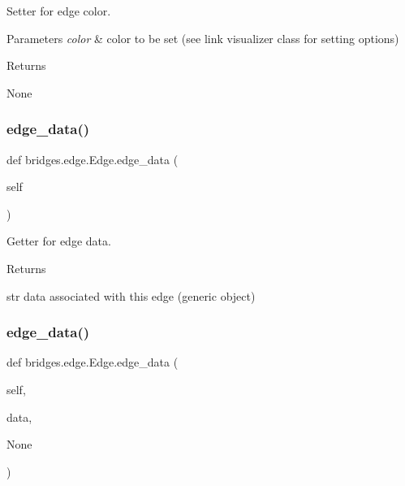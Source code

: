 Setter for edge color. 


\begin{DoxyParams}{Parameters}
{\em color} & color to be set (see link visualizer class for setting options) \\
\hline
\end{DoxyParams}
\begin{DoxyReturn}{Returns}


None 
\end{DoxyReturn}
\mbox{\label{classbridges_1_1edge_1_1_edge_abc3f52467d38ad2d7e06113d0c714ed6}} 
\subsubsection{\texorpdfstring{edge\+\_\+data()}{edge\_data()}\hspace{0.1cm}{\footnotesize\ttfamily [1/2]}}
{\footnotesize\ttfamily def bridges.\+edge.\+Edge.\+edge\+\_\+data (\begin{DoxyParamCaption}\item[{}]{self }\end{DoxyParamCaption})}



Getter for edge data. 

\begin{DoxyReturn}{Returns}


str data associated with this edge (generic object) 
\end{DoxyReturn}
\mbox{\label{classbridges_1_1edge_1_1_edge_a7429980b52d754159629c73c316cbc41}} 
\subsubsection{\texorpdfstring{edge\+\_\+data()}{edge\_data()}\hspace{0.1cm}{\footnotesize\ttfamily [2/2]}}
{\footnotesize\ttfamily def bridges.\+edge.\+Edge.\+edge\+\_\+data (\begin{DoxyParamCaption}\item[{}]{self,  }\item[{}]{data,  }\item[{}]{None }\end{DoxyParamCaption})}



